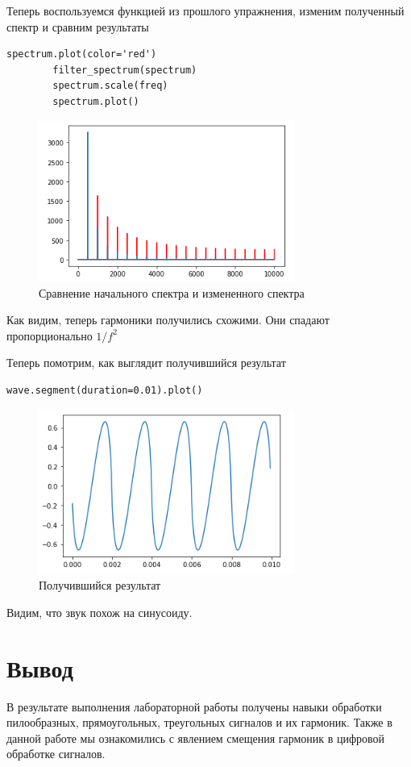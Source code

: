 \documentclass[a4paper,12pt]{article}
\begin{document}
\begin{enumerate}
	Теперь воспользуемся функцией из прошлого упражнения, изменим полученный спектр и сравним результаты
		\begin{lstlisting}[caption=Изменеие спектра]
		spectrum.plot(color='red')
		filter_spectrum(spectrum)
		spectrum.scale(freq)
		spectrum.plot()
	\end{lstlisting}
	\begin{figure}[H]
		\centering
		\includegraphics[width=0.75\textwidth]{6_2.png}
		\caption{Сравнение начального спектра и измененного спектра}
		\label{fig:6.2}
	\end{figure}
	
	Как видим, теперь гармоники получились схожими. Они спадают пропорционально \textit{\(1/f^2\)}
		
	Теперь помотрим, как выглядит получившийся результат
	\begin{lstlisting}[caption=Получившийся результат]
		wave.segment(duration=0.01).plot()
	\end{lstlisting}
	\begin{figure}[H]
		\centering
		\includegraphics[width=0.75\textwidth]{6_3.png}
		\caption{Получившийся результат}
		\label{fig:6.2}
	\end{figure}

	Видим, что звук похож на синусоиду.
	
\end{enumerate}

\newpage

\section{Вывод}
В результате выполнения лабораторной работы получены навыки обработки пилообразных, прямоугольных, треугольных сигналов и их гармоник. Также в данной работе мы ознакомились с явлением смещения гармоник в цифровой обработке сигналов.
\end{document}
